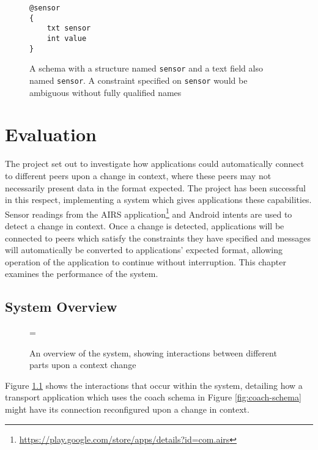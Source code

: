 \documentclass[12pt,twoside,notitlepage]{report}
\begin{document}
\begin{figure}[h]
\begin{lstlisting}
@sensor
{
	txt sensor
	int value
}
\end{lstlisting}
\caption[Ambiguously Named Schema]{A schema with a structure named {\tt sensor} and a text field also named {\tt sensor}. A constraint specified on {\tt sensor} would be ambiguous without fully qualified names}
\label{fig:repeatednameschema}
\end{figure}


\cleardoublepage


\chapter{Evaluation}

The project set out to investigate how applications could automatically connect to different peers upon a change in context, where these peers may not necessarily present data in the format expected. 
The project has been successful in this respect, implementing a system which gives applications these capabilities.  
Sensor readings from the AIRS application\footnote{\url{https://play.google.com/store/apps/details?id=com.airs}} and Android intents are used to detect a change in context. 
Once a change is detected, applications will be connected to peers which satisfy the constraints they have specified and messages will automatically be converted to applications' expected format, allowing operation of the application to continue without interruption. 
This chapter examines the performance of the system. 

\section{System Overview}

\begin{figure}[t]
\epsfxsize=\hsize
\centerline{}
\caption[System Overview]{An overview of the system, showing interactions between different parts upon a context change}
\label{fig:system_overview}
\end{figure}

Figure \ref{fig:system_overview} shows the interactions that occur within the system, detailing how a transport application which uses the coach schema in Figure \ref{fig:coach-schema} might have its connection reconfigured upon a change in context.
\end{document}
